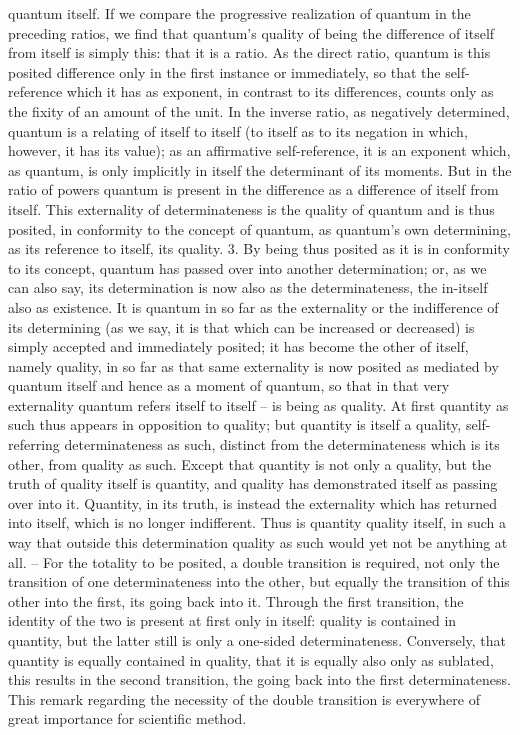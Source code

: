 quantum itself.
If we compare the progressive realization of quantum in the preceding
ratios, we find that quantum’s quality of being the difference of itself from
itself is simply this: that it is a ratio. As the direct ratio, quantum is this
posited difference only in the first instance or immediately, so that the self-
reference which it has as exponent, in contrast to its differences, counts
only as the fixity of an amount of the unit. In the inverse ratio, as negatively
determined, quantum is a relating of itself to itself (to itself as to its negation
in which, however, it has its value); as an affirmative self-reference, it is an
exponent which, as quantum, is only implicitly in itself the determinant of
its moments. But in the ratio of powers quantum is present in the difference
as a difference of itself from itself. This externality of determinateness is the
quality of quantum and is thus posited, in conformity to the concept
of quantum, as quantum’s own determining, as its reference to itself, its
quality.
3. By being thus posited as it is in conformity to its concept, quantum
has passed over into another determination; or, as we can also say, its
determination is now also as the determinateness, the in-itself also as existence.
It is quantum in so far as the externality or the indifference of its determining
(as we say, it is that which can be increased or decreased) is simply accepted
and immediately posited; it has become the other of itself, namely quality,
in so far as that same externality is now posited as mediated by quantum
itself and hence as a moment of quantum, so that in that very externality
quantum refers itself to itself – is being as quality.
At first quantity as such thus appears in opposition to quality; but
quantity is itself a quality, self-referring determinateness as such, distinct
from the determinateness which is its other, from quality as such. Except
that quantity is not only a quality, but the truth of quality itself is quantity,
and quality has demonstrated itself as passing over into it. Quantity, in
its truth, is instead the externality which has returned into itself, which is
no longer indifferent. Thus is quantity quality itself, in such a way that
outside this determination quality as such would yet not be anything at
all. – For the totality to be posited, a double transition is required, not
only the transition of one determinateness into the other, but equally the
transition of this other into the first, its going back into it. Through the
first transition, the identity of the two is present at first only in itself:
quality is contained in quantity, but the latter still is only a one-sided
determinateness. Conversely, that quantity is equally contained in quality,
that it is equally also only as sublated, this results in the second transition,
the going back into the first determinateness. This remark regarding the
necessity of the double transition is everywhere of great importance for
scientific method.

